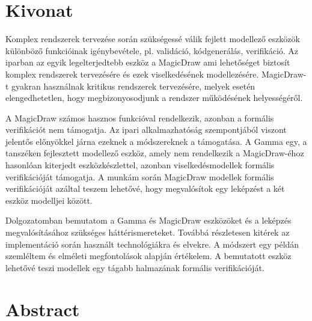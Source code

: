 \setcounter{page}{1}

\selecthungarian

\chapter*{Kivonat}

Komplex rendszerek tervezése során szükségessé válik fejlett modellező eszközök különböző funkcióinak igénybevétele, pl. validáció, kódgenerálás, verifikáció. Az iparban az egyik legelterjedtebb eszköz a MagicDraw ami lehetőséget biztosít komplex rendszerek tervezésére és ezek viselkedésének modellezésére. MagicDraw-t gyakran használnak kritikus rendszerek tervezésére, melyek esetén elengedhetetlen, hogy megbizonyosodjunk a rendszer működésének helyességéről.

A MagicDraw számos hasznos funkcióval rendelkezik, azonban a formális verifikációt nem támogatja. Az ipari alkalmazhatóság szempontjából viszont jelentős előnyökkel járna ezeknek a módszereknek a támogatása.
A Gamma egy, a tanszéken fejlesztett modellező eszköz, amely nem rendelkezik a MagicDraw-éhoz hasonlóan kiterjedt eszközkészlettel, azonban viselkedésmodellek formális verifikációját támogatja. A munkám során MagicDraw modellek formális verifikációját azáltal teszem lehetővé, hogy megvalósítok egy leképzést a két eszköz modelljei között.

Dolgozatomban bemutatom a Gamma és MagicDraw eszközöket és a leképzés megvalósításához szükséges háttérismereteket. Továbbá részletesen kitérek az implementáció során használt technológiákra és elvekre. A módszert egy példán szemléltem és elméleti megfontolások alapján értékelem. A bemutatott eszköz lehetővé teszi modellek egy tágabb halmazának formális verifikációját.


\vfill
\selectenglish


\chapter*{Abstract}

